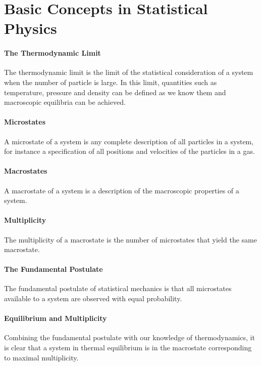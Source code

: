 \section{Basic Concepts in Statistical Physics}

\paragraph{The Thermodynamic Limit}
The thermodynamic limit is the limit of the statistical consideration of a system when the number of particle is large. In this limit, quantities such as temperature, pressure and density can be defined as we know them and macroscopic equilibria can be achieved.

\paragraph{Microstates}
A microstate of a system is any complete description of all particles in a system, for instance a specification of all positions and velocities of the particles in a gas.

\paragraph{Macrostates}
A macrostate of a system is a description of the macroscopic properties of a system.

\paragraph{Multiplicity}
The multiplicity of a macrostate is the number of microstates that yield the same macrostate.

\paragraph{The Fundamental Postulate}
The fundamental postulate of statistical mechanics is that all microstates available to a system are observed with equal probability.

\paragraph{Equilibrium and Multiplicity}
Combining the fundamental postulate with our knowledge of thermodynamics, it is clear that a system in thermal equilibrium is in the macrostate corresponding to maximal multiplicity.

